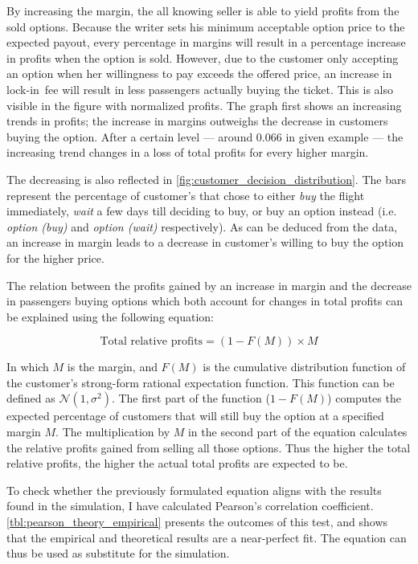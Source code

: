 
By increasing the margin, the all knowing seller is able to yield profits from the sold options. Because the writer sets his minimum acceptable option price to the expected payout, every percentage in margins will result in a percentage increase in profits when the option is sold. However, due to the customer only accepting an option when her willingness to pay exceeds the offered price, an increase in lock-in~fee will result in less passengers actually buying the ticket. This is also visible in the figure with normalized profits. The graph first shows an increasing trends in profits; the increase in margins outweighs the decrease in customers buying the option. After a certain level --- around 0.066 in given example --- the increasing trend changes in a loss of total profits for every higher margin.

The decreasing is also reflected in \autoref{fig:customer_decision_distribution}. The bars represent the percentage of customer's that chose to either \emph{buy} the flight immediately, \emph{wait} a few days till deciding to buy, or buy an option instead (i.e. \emph{option (buy)} and \emph{option (wait)} respectively). As can be deduced from the data, an increase in margin leads to a decrease in customer's willing to buy the option for the higher price.


The relation between the profits gained by an increase in margin and the decrease in passengers buying options which both account for changes in total profits can be explained using the following equation:

$$ \mbox{Total relative profits} = (1 - F(M)) \times M $$

In which $M$ is the margin, and $F(M)$ is the cumulative distribution function of the customer's strong-form rational expectation function. This function can be defined as $\mathcal{N}(1, \sigma^2)$. The first part of the function ($1 - F(M)$) computes the expected percentage of customers that will still buy the option at a specified margin $M$. The multiplication by $M$ in the second part of the equation calculates the relative profits gained from selling all those options. Thus the higher the total relative profits, the higher the actual total profits are expected to be.

To check whether the previously formulated equation aligns with the results found in the simulation, I have calculated Pearson's correlation coefficient. \autoref{tbl:pearson_theory_empirical} presents the outcomes of this test, and shows that the empirical and theoretical results are a near-perfect fit. The equation can thus be used as substitute for the simulation.

